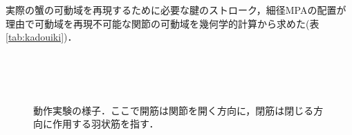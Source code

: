 \documentclass{jarticle}
\begin{document}
実際の蟹の可動域を再現するために必要な腱のストローク，細径MPAの配置が理由で可動域を再現不可能な関節の可動域を幾何学的計算から求めた(表\ref{tab:kadouiki})．
\vspace*{-4mm}
\begin{figure}[t]
  \centering
  \\
  \label{fig:move1}
  \vspace{-2mm}
  \\
  \label{fig:move2} 
  \vspace{-2mm}
  \\
  \label{fig:move3} 
  \vspace{-2mm}
  \caption{動作実験の様子．ここで開筋は関節を開く方向に，閉筋は閉じる方向に作用する羽状筋を指す．}
  \label{fig:jikken}
  \vspace{-2mm}
\end{figure}
\vspace*{-2mm}
\end{document}
